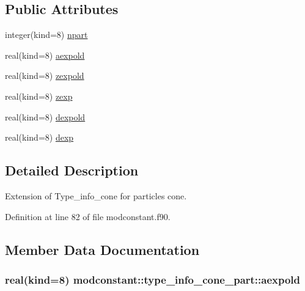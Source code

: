 \subsection*{Public Attributes}
\begin{DoxyCompactItemize}
\item 
integer(kind=8) \hyperlink{structmodconstant_1_1type__info__cone__part_a73d3e6327f56d23694d86bd5167602d6}{npart}
\item 
real(kind=8) \hyperlink{structmodconstant_1_1type__info__cone__part_ab2393ee4d75223f0f28e474c42836743}{aexpold}
\item 
real(kind=8) \hyperlink{structmodconstant_1_1type__info__cone__part_a44164e6a95ebcda4cc1ded30ba9b1bd5}{zexpold}
\item 
real(kind=8) \hyperlink{structmodconstant_1_1type__info__cone__part_a0fcdc6b7c3ad1553a7ab4e7d839d82ed}{zexp}
\item 
real(kind=8) \hyperlink{structmodconstant_1_1type__info__cone__part_a31961ed81e5aac15547157376f406298}{dexpold}
\item 
real(kind=8) \hyperlink{structmodconstant_1_1type__info__cone__part_a385288d5451a9e5a796cd95703c64123}{dexp}
\end{DoxyCompactItemize}


\subsection{Detailed Description}
Extension of Type\-\_\-info\-\_\-cone for particles cone. 

Definition at line 82 of file modconstant.\-f90.



\subsection{Member Data Documentation}
\hypertarget{structmodconstant_1_1type__info__cone__part_ab2393ee4d75223f0f28e474c42836743}{
\subsubsection[{aexpold}]{\setlength{\rightskip}{0pt plus 5cm}real(kind=8) modconstant\-::type\-\_\-info\-\_\-cone\-\_\-part\-::aexpold}}\label{structmodconstant_1_1type__info__cone__part_ab2393ee4d75223f0f28e474c42836743}


